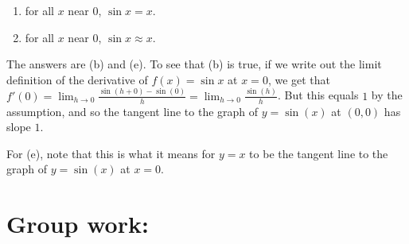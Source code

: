 \documentclass[handout,nooutcomes]{ximera}
\begin{document}
\begin{enumerate}
\begin{enumerate}
		\item for all $x$ near $0$, $\sin x = x$.
		
		\item for all $x$ near $0$, $\sin x \approx x$.
		
		\end{enumerate} 
	
			\begin{freeResponse}
			The answers are (b) and (e).  To see that (b) is true, if we write out the limit definition of the derivative of $f(x) = \sin x$ at $x=0$, we get that 
			$f'(0) = \lim_{h \to 0} \frac{\sin (h + 0) - \sin (0)}{h}
			= \lim_{h \to 0} \frac{\sin (h)}{h}$.  
			But this equals $1$ by the assumption, and so the tangent line to the graph of $y = \sin(x)$ at $(0,0)$ has slope $1$.  
			
			For (e), note that this is what it means for $y=x$ to be the tangent line to the graph of $y = \sin(x)$ at $x=0$.
			\end{freeResponse}
		
	\end{enumerate}
	
	
	
	
	
	

\section*{Group work:}
\end{document}
